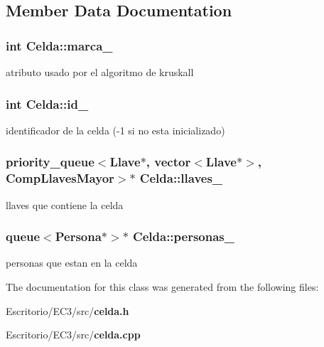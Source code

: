 \subsection{Member Data Documentation}
\subsubsection{\setlength{\rightskip}{0pt plus 5cm}int {\bf Celda::marca\_\-}\hspace{0.3cm}{\tt  [private]}}\label{classCelda_9b7323513a6c6cf91ad51e3244d0ebaf}


atributo usado por el algoritmo de kruskall 

\subsubsection{\setlength{\rightskip}{0pt plus 5cm}int {\bf Celda::id\_\-}\hspace{0.3cm}{\tt  [private]}}\label{classCelda_1a63da7317f8a091b8e88f645b83471c}


identificador de la celda (-1 si no esta inicializado) 

\subsubsection{\setlength{\rightskip}{0pt plus 5cm}priority\_\-queue$<${\bf Llave}$\ast$, vector$<${\bf Llave}$\ast$$>$, {\bf CompLlavesMayor}$>$$\ast$ {\bf Celda::llaves\_\-}\hspace{0.3cm}{\tt  [private]}}\label{classCelda_e25fa0aa2f5529da984cad8e43f6c12a}


llaves que contiene la celda 

\subsubsection{\setlength{\rightskip}{0pt plus 5cm}queue$<${\bf Persona}$\ast$$>$$\ast$ {\bf Celda::personas\_\-}\hspace{0.3cm}{\tt  [private]}}\label{classCelda_074964127aaa40f1b9794cdf01344dd9}


personas que estan en la celda 



The documentation for this class was generated from the following files:\begin{CompactItemize}
\item 
Escritorio/EC3/src/{\bf celda.h}\item 
Escritorio/EC3/src/{\bf celda.cpp}\end{CompactItemize}
